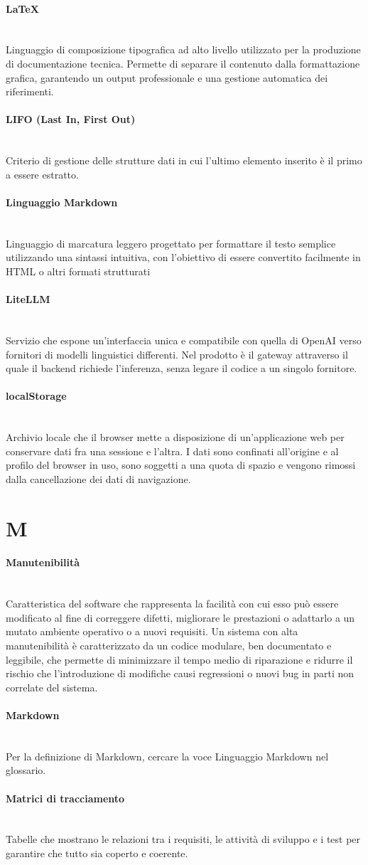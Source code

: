 \documentclass[a4paper, 10pt, colorlinks=true, linkcolor=black, urlcolor=blue, citecolor=blue, hidelinks]{article}
\newcommand{\glossaryterm}[2]{
    \paragraph{#1 \label{term:#1}} \mbox{} \\
    #2
    \vspace{0.5em}
}
\begin{document}
\glossaryterm{LaTeX}{Linguaggio di composizione tipografica ad alto livello utilizzato per la produzione di documentazione tecnica. Permette di separare il contenuto dalla formattazione grafica, garantendo un output professionale e una gestione automatica dei riferimenti.}

\glossaryterm{LIFO (Last In, First Out)}{Criterio di gestione delle strutture dati in cui l'ultimo elemento inserito è il primo a essere estratto.}

\glossaryterm{Linguaggio Markdown}{Linguaggio di marcatura leggero progettato per formattare il testo semplice utilizzando una sintassi intuitiva, con l’obiettivo di essere convertito facilmente in HTML o altri formati strutturati}

\glossaryterm{LiteLLM}{Servizio che espone un'interfaccia unica e compatibile con quella di OpenAI verso fornitori di modelli linguistici differenti. Nel prodotto è il gateway attraverso il quale il backend richiede l'inferenza, senza legare il codice a un singolo fornitore.}

\glossaryterm{localStorage}{Archivio locale che il browser mette a disposizione di un'applicazione web per conservare dati fra una sessione e l'altra. I dati sono confinati all'origine e al profilo del browser in uso, sono soggetti a una quota di spazio e vengono rimossi dalla cancellazione dei dati di navigazione.}

\newpage

\section*{M}

\glossaryterm{Manutenibilità}{Caratteristica del software che rappresenta la facilità con cui esso può essere modificato al fine di correggere difetti, migliorare le prestazioni o adattarlo a un mutato ambiente operativo o a nuovi requisiti. Un sistema con alta manutenibilità è caratterizzato da un codice modulare, ben documentato e leggibile, che permette di minimizzare il tempo medio di riparazione e ridurre il rischio che l'introduzione di modifiche causi regressioni o nuovi bug in parti non correlate del sistema.}

\glossaryterm{Markdown}{Per la definizione di Markdown, cercare la voce Linguaggio Markdown nel glossario.}

\glossaryterm{Matrici di tracciamento}{Tabelle che mostrano le relazioni tra i requisiti, le attività di sviluppo e i test per garantire che tutto sia coperto e coerente.}
\end{document}

